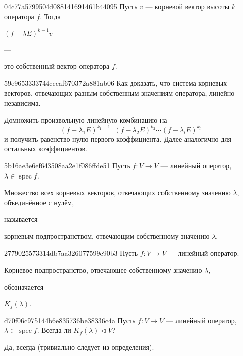 \begin{note}{04c77a5799504d088141691461b44095}
    Пусть \( v \) --- корневой вектор высоты \( k \) оператора \( f \). Тогда \begin{icloze}{2}\( (f - \lambda E)^{k - 1}v \)\end{icloze} --- \begin{icloze}{1}это собственный вектор оператора \( f \).\end{icloze}
\end{note}

\begin{note}{59e9653333744cccaf670372a881ab06}
    Как доказать, что система корневых векторов, отвечающих разным собственным значениям оператора, линейно независима.

    \begin{cloze}{1}
        Домножить произвольную линейную комбинацию на
        \[
            (f - \lambda_1 E)^{k_1 - 1} \;\; (f - \lambda_2 E)^{k_2} \cdots (f - \lambda_l E)^{k_l}
        \]
        и получить равенство нулю первого коэффициента. Далее аналогично для остальных коэффициентов.
    \end{cloze}
\end{note}

\begin{note}{5b16ae3e6ef643508aa2e1f086ffde51}
    Пусть \( f : V \to V \) --- линейный оператор, \( \lambda \in \operatorname{spec} f \).
    \begin{icloze}{1}Множество всех корневых векторов, отвечающих собственному значению \( \lambda \), объединённое с нулём,\end{icloze} называется \begin{icloze}{2}корневым подпространством, отвечающим собственному значению \( \lambda \).\end{icloze}
\end{note}

\begin{note}{2779025573314db7aa326077599c90b3}
    Пусть \( f : V \to V \) --- линейный оператор.
    \begin{icloze}{2}Корневое подпространство, отвечающее собственному значению \( \lambda \),\end{icloze} обозначается \begin{icloze}{1}\( K_f (\lambda) \).\end{icloze}
\end{note}

\begin{note}{d70f06c975144b6e835736be38336c4a}
    Пусть \( f : V \to V \) --- линейный оператор, \( \lambda \in \operatorname{spec} f \).
    Всегда ли \( K_f(\lambda) \triangleleft V \)?

    \begin{cloze}{1}
        Да, всегда (тривиально следует из определения).
    \end{cloze}
\end{note}

